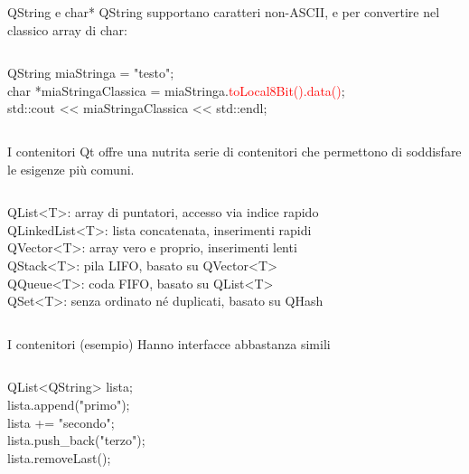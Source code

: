 \documentclass{beamer}
\begin{document}
\begin{frame}{QString e char*}
	QString supportano caratteri non-ASCII, e per convertire nel classico array di char:
	\begin{columns}
		\begin{block}{}
			{\ttfamily QString miaStringa = "testo";\\
				char *miaStringaClassica = miaStringa.\textcolor{red}{toLocal8Bit().data()};\\
				std::cout << miaStringaClassica << std::endl;}
		\end{block}
	\end{columns}
\end{frame}

\begin{frame}{I contenitori}
	Qt offre una nutrita serie di contenitori che permettono di soddisfare le esigenze più comuni.
	\bigskip
	\begin{columns}
		\column{0.8\textwidth}
		\begin{block}{}
			{\ttfamily QList<T>}: array di puntatori, accesso via indice rapido\\
			{\ttfamily QLinkedList<T>}: lista concatenata, inserimenti rapidi\\
			{\ttfamily QVector<T>}: array vero e proprio, inserimenti lenti\\
			{\ttfamily QStack<T>}: pila LIFO, basato su {\ttfamily QVector<T>}\\
			{\ttfamily QQueue<T>}: coda FIFO, basato su {\ttfamily QList<T>}\\
			{\ttfamily QSet<T>}: senza ordinato né duplicati, basato su {\ttfamily QHash}
		\end{block}
	\end{columns}
	\bigskip
\end{frame}

\begin{frame}{I contenitori (esempio)}
	Hanno interfacce abbastanza simili
	\bigskip
	\begin{columns}
		\column{0.5\textwidth}
		\begin{block}{}
			{\ttfamily QList<QString> lista;\\
				lista.append("primo");\\
				lista += "secondo";\\
				lista.push\_back("terzo");\\
				lista.removeLast();}
		\end{block}
	\end{columns}
	\bigskip
\end{frame}
\end{document}
